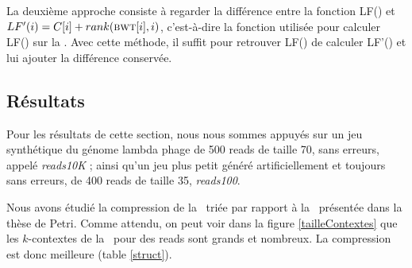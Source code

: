 La deuxième approche consiste à regarder la différence entre la fonction LF() et $LF'(i) = C[i] + rank(\textsc{bwt}[i], i)$, c'est-à-dire la fonction utilisée pour calculer LF() sur la \bwt. Avec cette méthode, il suffit pour retrouver LF() de calculer LF'() et lui ajouter la différence conservée.



%

%
%
%

\subsection{Résultats} 


Pour les résultats de cette section, nous nous sommes appuyés sur un jeu synthétique du génome lambda phage de 500 reads de taille 70, sans erreurs, appelé \textit{reads10K} ; ainsi qu'un jeu plus petit généré artificiellement et toujours sans erreurs, de 400 reads de taille 35, \textit{reads100}.

Nous avons étudié la compression de la \kbwt\ triée par rapport à la \kbwt\ présentée dans la thèse de Petri. Comme attendu, on peut voir dans la figure \ref{tailleContextes} que les $k$-contextes de la \kbwt\ pour des reads sont grands et nombreux. La compression est donc meilleure (table \ref{struct}).

